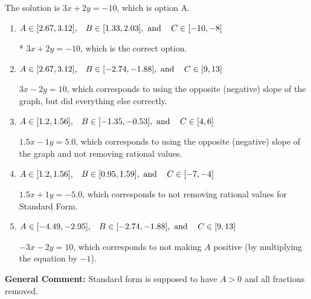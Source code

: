 \documentclass{extbook}[14pt]
\begin{document}
\begin{enumerate}
{The solution is \( 3x + 2y = -10 \), which is option A.\begin{enumerate}[label=\Alph*.]
\item \( A \in [2.67, 3.12], \hspace{3mm} B \in [1.33, 2.03], \text{ and } \hspace{3mm} C \in [-10, -8] \)

* $3x + 2y = -10$, which is the correct option.
\item \( A \in [2.67, 3.12], \hspace{3mm} B \in [-2.74, -1.88], \text{ and } \hspace{3mm} C \in [9, 13] \)

 $3x - 2y = 10$, which corresponds to using the opposite (negative) slope of the graph, but did everything else correctly.
\item \( A \in [1.2, 1.56], \hspace{3mm} B \in [-1.35, -0.53], \text{ and } \hspace{3mm} C \in [4, 6] \)

 $1.5x - 1y = 5.0$, which corresponds to using the opposite (negative) slope of the graph and not removing rational values.
\item \( A \in [1.2, 1.56], \hspace{3mm} B \in [0.95, 1.59], \text{ and } \hspace{3mm} C \in [-7, -4] \)

 $1.5x + 1y = -5.0$, which corresponds to not removing rational values for Standard Form.
\item \( A \in [-4.49, -2.95], \hspace{3mm} B \in [-2.74, -1.88], \text{ and } \hspace{3mm} C \in [9, 13] \)

 $-3x - 2y = 10$, which corresponds to not making $A$ positive (by multiplying the equation by $-1$).
\end{enumerate}

\textbf{General Comment:} Standard form is supposed to have $A > 0$ and all fractions removed.
}
\end{enumerate}
\end{document}
